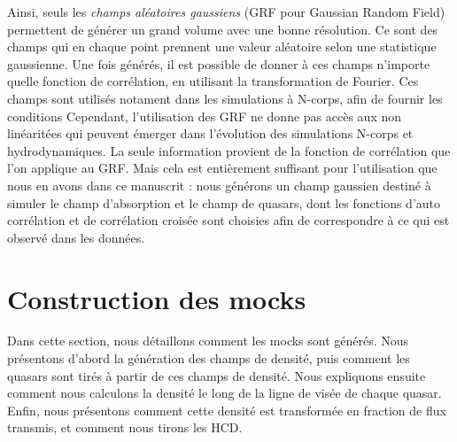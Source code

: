 \documentclass[11pt, twoside, a4paper, openright]{report}
\begin{document}
Ainsi, seuls les \emph{champs aléatoires gaussiens} (GRF pour Gaussian Random Field) permettent de générer un grand volume avec une bonne résolution.
Ce sont des champs qui en chaque point prennent une valeur aléatoire selon une statistique gaussienne.
Une fois générés, il est possible de donner à ces champs n'importe quelle fonction de corrélation, en utilisant la transformation de Fourier.
Ces champs sont utilisés notament dans les simulations à N-corps, afin de fournir les conditions 
Cependant, l'utilisation des GRF ne donne pas accès aux non linéaritées qui peuvent émerger dans l'évolution des simulations N-corps et hydrodynamiques. La seule information provient de la fonction de corrélation que l'on applique au GRF.
Mais cela est entièrement suffisant pour l'utilisation que nous en avons dans ce manuscrit : nous générons un champ gaussien destiné à simuler le champ d'absorption \lya{} et le champ de quasars, dont les fonctions d'auto corrélation et de corrélation croisée sont choisies afin de correspondre à ce qui est observé dans les données.


\section{Construction des mocks}
Dans cette section, nous détaillons comment les mocks sont générés.
Nous présentons d'abord la génération des champs de densité,
puis comment les quasars sont tirés à partir de ces champs de densité.
Nous expliquons ensuite comment nous calculons la densité le long de la ligne de visée de chaque quasar.
Enfin, nous présentons comment cette densité est transformée en fraction de flux transmis, et comment nous tirons les HCD.
\end{document}
